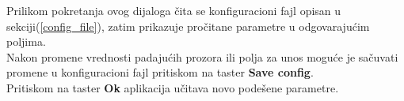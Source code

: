 Prilikom pokretanja ovog dijaloga čita se konfiguracioni fajl opisan u
sekciji(\ref{config_file}), zatim prikazuje pročitane parametre u odgovarajućim
poljima. \\

Nakon promene vrednosti padajućih prozora ili polja za unos moguće je sačuvati
promene u konfiguracioni fajl pritiskom na taster \textbf{Save config}. \\
Pritiskom na taster \textbf{Ok} aplikacija učitava novo podešene parametre. \\

\begin{figure}[H]
\end{figure}